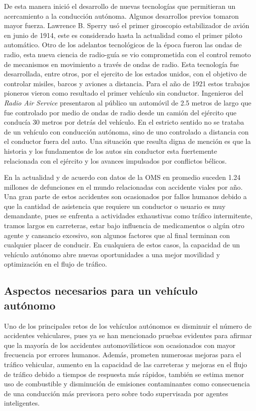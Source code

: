 De esta manera inició el desarrollo de nuevas tecnologías que permitieran un acercamiento a la conducción autónoma. Algunos desarrollos previos tomaron mayor fuerza. Lawrence B. Sperry usó el primer giroscopio estabilizador de avión en junio de 1914, este es considerado hasta la actualidad como el primer piloto automático. Otro de los adelantos tecnológicos de la época fueron las ondas de radio, esta nueva ciencia de radio-guía se vio comprometida con el control remoto de mecanismos en movimiento a través de ondas de radio. Esta tecnología fue desarrollada, entre otros, por el ejercito de los estados unidos, con el objetivo de controlar misiles, barcos y aviones a distancia. Para el año de 1921 estos trabajos pioneros vieron como resultado el primer vehículo sin conductor. Ingenieros del \textit{Radio Air Service} presentaron al público un automóvil de 2.5 metros de largo  que fue controlado por medio de ondas de radio desde un camión del ejército que conducía 30 metros por detrás del vehículo. En el estricto sentido no se trataba de un vehículo con conducción autónoma, sino de uno controlado a distancia con el conductor fuera del auto. Una situación que resulta digna de mención es que la historia y los fundamentos de los autos sin conductor esta fuertemente relacionada con el ejército y los avances impulsados por conflictos bélicos.

En la actualidad y de acuerdo con datos de la OMS en promedio suceden 1.24 millones de defunciones en el mundo relacionadas con accidente viales por año\cite{lenz2016autonomous}. Una gran parte de estos accidentes son ocasionados por fallos humanos debido a que la cantidad de asistencia que requiere un conductor o usuario es muy demandante, pues se enfrenta a actividades exhaustivas como tráfico intermitente, tramos largos en carreteras, estar bajo influencia de medicamentos o algún otro agente y cansancio excesivo, son algunos factores que al final terminan con cualquier placer de conducir. En cualquiera de estos casos, la capacidad de un vehículo autónomo abre nuevas oportunidades a una mejor movilidad y optimización en el flujo de tráfico.

\subsection{Aspectos necesarios para un vehículo autónomo} \label{sub:aspectos_necesarios_para_un_vehículo_autónomo}

Uno de los principales retos de los vehículos autónomos es disminuir el número de accidentes vehiculares, pues ya se han mencionado pruebas evidentes para afirmar que la mayoría de los accidentes automovilísticos son ocasionados con mayor frecuencia por errores humanos. Además, prometen numerosas mejoras para el tráfico vehicular, aumento en la capacidad de las carreteras y mejoras en el flujo de tráfico debido a tiempos de respuesta más rápidos, también se estima menor uso de combustible y disminución de emisiones contaminantes como consecuencia de una conducción más previsora pero sobre todo supervisada por agentes inteligentes.\cite{luettel2012autonomous}

